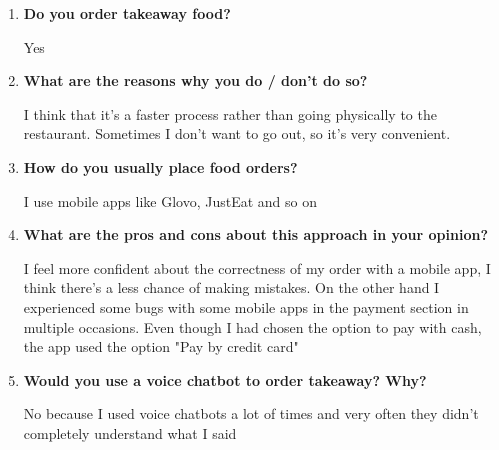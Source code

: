 \begin{enumerate}

\item \textbf{Do you order takeaway food?}

Yes

\item \textbf{What are the reasons why you do / don't do so?}

I think that it's a faster process rather than going physically to the restaurant. Sometimes I don't want to go out, so it's very convenient.

\item \textbf{How do you usually place food orders?}

I use mobile apps like Glovo, JustEat and so on

\item \textbf{What are the pros and cons about this approach in your opinion?}

I feel more confident about the correctness of my order with a mobile app, I think there's a less chance of making mistakes. On the other hand I experienced some bugs with some mobile apps in the payment section in multiple occasions. Even though I had chosen the option to pay with cash, the app used the option "Pay by credit card"

\item \textbf{Would you use a voice chatbot to order takeaway? Why?}

No because I used voice chatbots a lot of times and very often they didn't completely understand what I said

\end{enumerate}